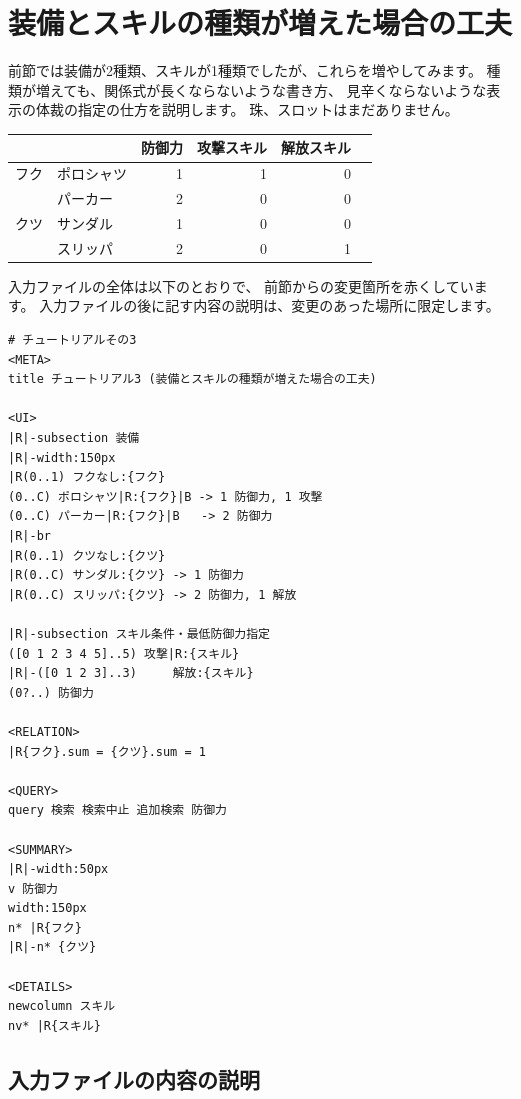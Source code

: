 \documentclass[dvipdfmx]{jsarticle}
\begin{document}
\section{装備とスキルの種類が増えた場合の工夫} %
前節では装備が2種類、スキルが1種類でしたが、これらを増やしてみます。
種類が増えても、関係式が長くならないような書き方、
見辛くならないような表示の体裁の指定の仕方を説明します。
%
珠、スロットはまだありません。
%
\begin{center}
\begin{tabular}{llrrrr}
\toprule
&& 防御力 & 攻撃スキル & 解放スキル\\
\midrule
フク
& ポロシャツ & 1 & 1 & 0\\
& パーカー   & 2 & 0 & 0\\
\midrule
クツ
& サンダル & 1 & 0 & 0\\
& スリッパ & 2 & 0 & 1\\
\bottomrule
\end{tabular}
\end{center}
%
入力ファイルの全体は以下のとおりで、
前節からの変更箇所を赤くしています。
入力ファイルの後に記す内容の説明は、変更のあった場所に限定します。
\medskip

{\footnotesize\begin{mdframed}\begin{Verbatim}[commandchars=|<>]
# チュートリアルその3
<META>
title チュートリアル3 (装備とスキルの種類が増えた場合の工夫)

<UI>
|R|-subsection 装備
|R|-width:150px
|R(0..1) フクなし:{フク}
(0..C) ポロシャツ|R:{フク}|B -> 1 防御力, 1 攻撃
(0..C) パーカー|R:{フク}|B   -> 2 防御力
|R|-br
|R(0..1) クツなし:{クツ}
|R(0..C) サンダル:{クツ} -> 1 防御力
|R(0..C) スリッパ:{クツ} -> 2 防御力, 1 解放

|R|-subsection スキル条件・最低防御力指定
([0 1 2 3 4 5]..5) 攻撃|R:{スキル}
|R|-([0 1 2 3]..3)     解放:{スキル}
(0?..) 防御力

<RELATION>
|R{フク}.sum = {クツ}.sum = 1

<QUERY>
query 検索 検索中止 追加検索 防御力

<SUMMARY>
|R|-width:50px
v 防御力
width:150px
n* |R{フク}
|R|-n* {クツ}

<DETAILS>
newcolumn スキル
nv* |R{スキル}
\end{Verbatim}
\end{mdframed}}

\subsection{入力ファイルの内容の説明}
\end{document}
